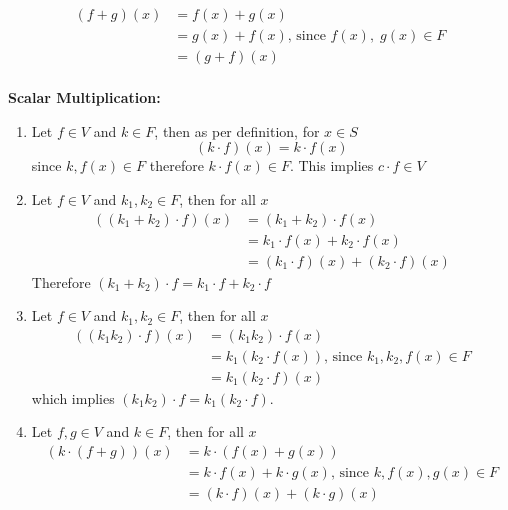 \documentclass[a4paper, titlepage]{article}
\begin{document}
\begin{enumerate}[label=\textbf{\arabic*.}]
\begin{enumerate}[label=\textbf{\alph*}]
\begin{align*}
            (f + g)(x) &= f(x) + g(x) \\
                       &= g(x) + f(x) \text{, since } f(x), \; g(x) \in F \\ 
                       &= (g + f)(x) \\
        \end{align*}
    \end{enumerate}
    \textbf{Scalar Multiplication: }
        \begin{enumerate}[label=\textbf{\alph*}]
            \item Let $f \in V$ and $k \in F$, then as per definition, for $x \in S$ 
            $$
                (k \cdot f)(x) = k\cdot f(x)
            $$
            since $k, f(x) \in F $ therefore $k\cdot f(x) \in F$. This 
            implies $c\cdot f \in V$
            \item Let $f \in V$ and $k_1, k_2 \in F$, then for all $x$
            \begin{align*}
                ((k_1 + k_2)\cdot f)(x) &= (k_1 + k_2)\cdot f(x) \\
                                        &= k_1\cdot f(x) + k_2\cdot f(x) \\
                                        &= (k_1\cdot f)(x) + (k_2\cdot f)(x)
            \end{align*}
            Therefore $(k_1 + k_2)\cdot f = k_1\cdot f + k_2\cdot f$
            \item Let $f \in V$ and $k_1, k_2 \in F$, then for all $x$
            \begin{align*}
                ((k_1k_2)\cdot f)(x) &= (k_1k_2)\cdot f(x) \\
                                        &= k_1(k_2\cdot f(x)) \text{, since } k_1, k_2, f(x) \in F\\
                                        &= k_1(k_2\cdot f)(x)
            \end{align*}
            which implies $(k_1k_2)\cdot f = k_1(k_2\cdot f)$.
            \item Let $f, g \in V$ and $k \in F$, then for all $x$
            \begin{align*}
                (k\cdot (f+g))(x) &= k\cdot (f(x) + g(x)) \\
                                        &= k\cdot f(x) + k\cdot g(x) \text{, since } k, f(x), g(x) \in F\\
                                        &= (k\cdot f)(x) + (k\cdot g)(x)
            \end{align*}

\end{enumerate}
\end{enumerate}
\end{document}
